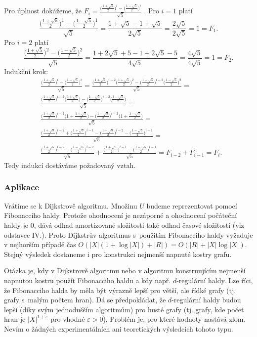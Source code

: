 \documentclass[a4paper,12pt]{article}
\begin{document}
Pro úplnost dokážeme, že $F_i=\frac {\big(\frac {
1+\sqrt 5}2\big)^i-\big(\frac {1-\sqrt 5}2\big)^i}{\sqrt 5}$ .\newline 
Pro $i=1$ platí 
$$\frac {\big(\frac {1+\sqrt 5}2\big)^1-\big(\frac {1-\sqrt 5}2\big
)^1}{\sqrt 5}=\frac {1+\sqrt 5-1+\sqrt 5}{2\sqrt 5}=\frac {2\sqrt 
5}{2\sqrt 5}=1=F_1.$$
Pro $i=2$ platí 
$$\frac {\big(\frac {1+\sqrt 5}2\big)^2-\big(\frac {1-\sqrt 5}2\big
)^2}{\sqrt 5}=\frac {1+2\sqrt 5+5-1+2\sqrt 5-5}{4\sqrt 5}=\frac {
4\sqrt 5}{4\sqrt 5}=1=F_2.$$
Indukční krok:
\begin{align*}&\frac {\big(\frac {1+\sqrt 5}2\big)^i-\big(\frac {1-\sqrt 
5}2\big)^i}{\sqrt 5}=\frac {\big(\frac {1+\sqrt 5}2\big)^{i-2}\big
(\frac {1+\sqrt 5}2\big)^2-\big(\frac {1-\sqrt 5}2\big)^{i-2}\big
(\frac {1-\sqrt 5}2\big)^2}{\sqrt 5}=\\
&\frac {\big(\frac {1+\sqrt 5}2\big)^{i-2}\big(\frac {3+\sqrt 5}2\big
)-\big(\frac {1-\sqrt 5}2\big)^{i-2}\big(\frac {3-\sqrt 5}2\big)}{\sqrt 
5}=\\
&\frac {\big(\frac {1+\sqrt 5}2\big)^{i-2}\big(1+\frac {1+\sqrt 5}
2\big)-\big(\frac {1-\sqrt 5}2\big)^{i-2}\big(1+\frac {1-\sqrt 5}
2\big)}{\sqrt 5}=\\
&\frac {\big(\frac {1+\sqrt 5}2\big)^{i-2}+\big(\frac {1+\sqrt 5}
2\big)^{i-1}-\big(\frac {1-\sqrt 5}2\big)^{i-2}-\big(\frac {1-\sqrt 
5}2\big)^{i-1}}{\sqrt 5}=\\
&\frac {\big(\frac {1+\sqrt 5}2\big)^{i-2}-\big(\frac {1-\sqrt 5}
2\big)^{i-2}}{\sqrt 5}+\frac {\big(\frac {1+\sqrt 5}2\big)^{i-1}-\big
(\frac {1-\sqrt 5}2\big)^{i-1}}{\sqrt 5}=F_{i-2}+F_{i-1}=F_i.\end{align*}
Tedy indukcí dostáváme požadovaný vztah.

\subsubsection{Aplikace }

Vrátíme se k Dijkstrově algoritmu.  
Množinu $U$ bude\-me reprezentovat pomocí Fibonacciho haldy.  
Protože ohodnocení je nezáporné a ohodnocení počáteční haldy 
je $0$, dává odhad amortizované složitosti také odhad časové 
složitosti (viz odstavec IV.).  Proto Dijkstrův 
algoritmus s~použitím 
Fibonacciho haldy vyžaduje v nejhorším případě čas 
$O(|X|(1+\log|X|)+|R|)=O(|R|+|X|\log|X|)$.  Stejný výsledek 
dostane\-me i pro konstrukci nejmenší napnuté kostry grafu.  

Otázka je, kdy v Dijkstrově algoritmu nebo v 
algoritmu konstruují\-cím nejmenší napnutou kostru použít Fibonacciho haldu a kdy 
např.  $d$-regu\-lár\-ní haldy. Lze 
říci, že Fibonacciho halda by měla být výrazně lepší pro 
větší, ale řídké grafy (tj. grafy s~malým počtem hran). 
Dá se předpokládat, že $d$-regulární haldy budou lepší 
(díky svým jednodušším algoritmům) pro husté 
grafy (tj. grafy, kde počet hran je $|X|^{1+\varepsilon}$ pro vhodné 
$\varepsilon >0$). Problém je, pro které hodnoty nastává zlom. 
Nevím o žádných experimentálních ani teoretických 
výsledcích tohoto typu.
\end{document}
